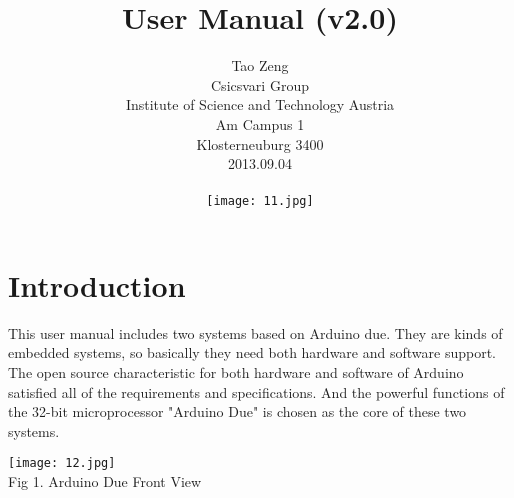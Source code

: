 \documentclass[12pt]{report}
\title{User Manual (v2.0)}
\author{Tao Zeng\vspace{10pt}\\Csicsvari Group\\Institute of Science and Technology Austria\\Am Campus 1\\Klosterneuburg 3400\vspace{10pt}\\2013.09.04\\\vspace{20pt}\\\texttt{[image: 11.jpg]}}
\begin{document}
\date{}
\maketitle
\vspace{10pt}
\newpage
\thispagestyle{empty}
\tableofcontents
\chapter{\Large Introduction}
\textup{This user manual includes two systems based on Arduino due. They are kinds of embedded systems, so basically they need both hardware and software support. The open source characteristic for both hardware and software of Arduino satisfied all of the requirements and specifications. And the powerful functions of the 32-bit microprocessor "Arduino Due" is chosen as the core of these two systems.}
\begin{center}
\texttt{[image: 12.jpg]}\\
\textup{\footnotesize Fig 1. Arduino Due Front View}
\end{center}
\end{document}
